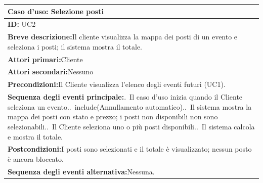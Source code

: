 \begin{center}
\small
\begin{tabular}{|p{}|}
\hline
\textbf{Caso d'uso: Selezione posti} \\ \hline
\textbf{ID:} UC2 \\ \hline
\textbf{Breve descrizione:}\newline Il cliente visualizza la mappa dei posti di un evento e seleziona i posti; il sistema mostra il totale. \\ \hline
\textbf{Attori primari:}\newline Cliente \\ \hline
\textbf{Attori secondari:}\newline Nessuno \\ \hline
\textbf{Precondizioni:}\newline Il Cliente visualizza l'elenco degli eventi futuri (UC1). \\ \hline
\textbf{Sequenza degli eventi principale:}\newline 1.~Il caso d'uso inizia quando il Cliente seleziona un evento.\newline
2.~include(Annullamento automatico).\newline
3.~Il sistema mostra la mappa dei posti con stato e prezzo; i posti non disponibili non sono selezionabili.\newline
4.~Il Cliente seleziona uno o più posti disponibili.\newline
5.~Il sistema calcola e mostra il totale. \\ \hline
\textbf{Postcondizioni:}\newline I posti sono selezionati e il totale è visualizzato; nessun posto è ancora bloccato. \\ \hline
\textbf{Sequenza degli eventi alternativa:}\newline Nessuna. \\ \hline
\end{tabular}
\end{center}

